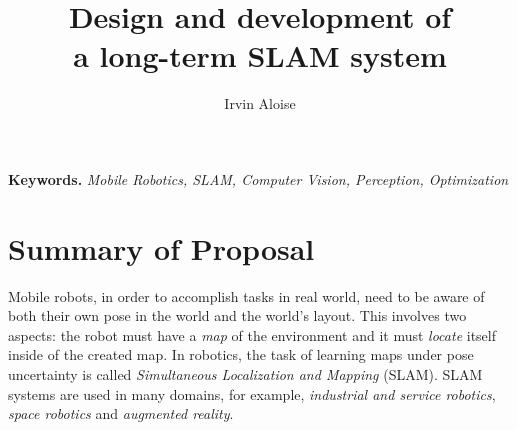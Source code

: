 \documentclass[10pt,a4paper, notitlepage]{report}
\title{Design and development of \\ a long-term SLAM system}
\author{Irvin Aloise}
\begin{document}
\maketitle


\textbf{Keywords.} \textit{Mobile Robotics, SLAM, Computer Vision, Perception, Optimization}


\section*{Summary of Proposal}
Mobile robots, in order to accomplish tasks in real world, need to be aware of both their own pose in the world and the world's layout. This involves two aspects: the robot must have a \textit{map} of the environment and it must \textit{locate} itself inside of the created map. In robotics, the task of learning maps under pose uncertainty is called \textit{Simultaneous Localization and Mapping} (SLAM). SLAM systems are used in many domains, for example, \textit{industrial and service robotics}, \textit{space robotics} and \textit{augmented reality}.
\end{document}
